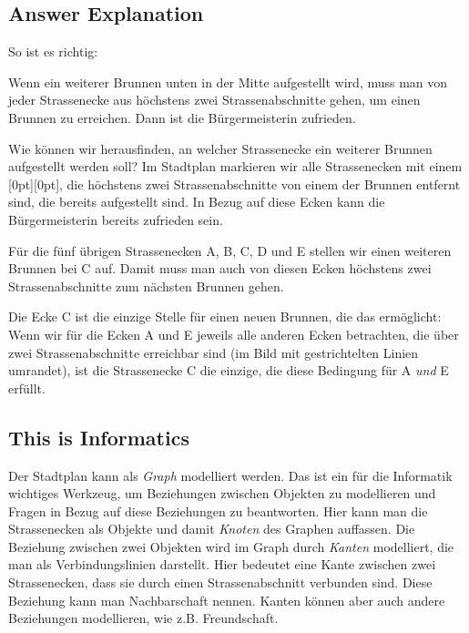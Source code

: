\documentclass[a4paper,11pt]{report}
\newcommand{\taskGraphicsFolder}{..}
\begin{document}
\endgroup

\subsection*{Answer Explanation}

So ist es richtig:

{\centering%
\par}

Wenn ein weiterer Brunnen unten in der Mitte aufgestellt wird, muss man von jeder Strassenecke aus höchstens zwei Strassenabschnitte gehen, um einen Brunnen zu erreichen.
Dann ist die Bürgermeisterin zufrieden.

Wie können wir herausfinden, an welcher Strassenecke
ein weiterer Brunnen aufgestellt werden soll?
Im Stadtplan markieren wir alle Strassenecken mit einem \raisebox{-0.5ex}[0pt][0pt]{},
die höchstens zwei Strassenabschnitte von einem der Brunnen entfernt sind, die bereits aufgestellt sind.
In Bezug auf diese Ecken kann die Bürgermeisterin bereits zufrieden sein.

{\centering%
\par}

Für die fünf übrigen Strassenecken A, B, C, D und E stellen wir einen weiteren Brunnen bei C auf. Damit muss man auch von diesen Ecken höchstens zwei Strassenabschnitte zum nächsten Brunnen gehen.

Die Ecke C ist die einzige Stelle für einen neuen Brunnen, die das ermöglicht:
Wenn wir für die Ecken A und E jeweils alle anderen Ecken betrachten, die über zwei Strassenabschnitte erreichbar sind (im Bild mit gestrichtelten Linien umrandet),
ist die Strassenecke C die einzige, die diese Bedingung für A \emph{und} E erfüllt.


\subsection*{This is Informatics}

Der Stadtplan kann als \emph{Graph} modelliert werden.
Das ist ein für die Informatik wichtiges Werkzeug, um Beziehungen zwischen Objekten zu modellieren
und Fragen in Bezug auf diese Beziehungen zu beantworten.
Hier kann man die Strassenecken als Objekte und damit \emph{Knoten} des Graphen auffassen.
Die Beziehung zwischen zwei Objekten wird im Graph durch \emph{Kanten} modelliert, die man als Verbindungslinien darstellt. Hier bedeutet eine Kante zwischen zwei Strassenecken, dass sie durch einen Strassenabschnitt verbunden sind. Diese Beziehung kann man Nachbarschaft nennen. Kanten können aber auch andere Beziehungen modellieren, wie z.B. Freundschaft.
\end{document}
